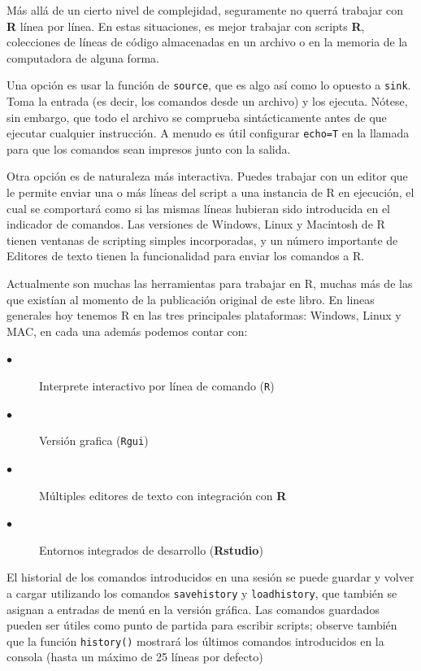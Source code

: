 Más allá de un cierto nivel de complejidad, seguramente no querrá trabajar con
\textbf{R} línea por línea. En estas situaciones, es mejor trabajar con scripts
\textbf{R}, colecciones de líneas de código almacenadas en un archivo o en la
memoria de la computadora de alguna forma.

Una opción es usar la función de \texttt{source}, que es algo así como lo
opuesto a \texttt{sink}. Toma la entrada (es decir, los comandos desde un
archivo) y los ejecuta. Nótese, sin embargo, que todo el archivo se comprueba
sintácticamente antes de que ejecutar cualquier instrucción. A menudo es útil
configurar \texttt{echo=T} en la llamada para que los comandos sean impresos
junto con la salida.

Otra opción es de naturaleza más interactiva. Puedes trabajar con un editor que
le permite enviar una o más líneas del script a una instancia de R en
ejecución, el cual se comportará como si las mismas líneas hubieran sido
introducida en el indicador de comandos. Las versiones de Windows, Linux y
Macintosh de R tienen ventanas de scripting simples incorporadas, y un número
importante de Editores de texto tienen la funcionalidad para enviar los
comandos a R.

\begin{tradnote}

	Actualmente son muchas las herramientas para trabajar en R, muchas más de
	las que existían al momento de la publicación original de este libro. En
	lineas generales hoy tenemos R en las tres principales plataformas:
	Windows, Linux y MAC, en cada una además podemos contar con:

	\begin{description}
	\item[$\bullet$] Interprete interactivo por línea de comando (\texttt{R})
	\item[$\bullet$] Versión grafica (\texttt{Rgui})
	\item[$\bullet$] Múltiples editores de texto con integración con \textbf{R}
	\item[$\bullet$] Entornos integrados de desarrollo (\textbf{Rstudio})
	\end{description}

\end{tradnote}

El historial de los comandos introducidos en una sesión se puede guardar y
volver a cargar utilizando los comandos \texttt{savehistory} y
\texttt{loadhistory}, que también se asignan a entradas de menú en la versión
gráfica. Las comandos guardados pueden ser útiles como punto de partida para
escribir scripts; observe también que la función \texttt{history()} mostrará
los últimos comandos introducidos en la consola (hasta un máximo de 25 líneas
por defecto)

